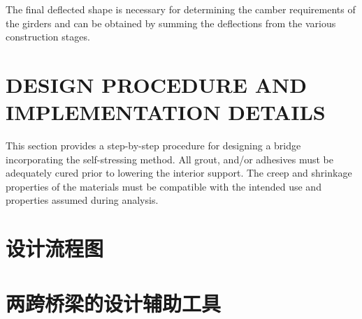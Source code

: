The final deflected shape is necessary for determining the camber requirements of the girders and can be obtained by summing the deflections from the various construction stages.

\section{DESIGN PROCEDURE AND IMPLEMENTATION DETAILS}

This section provides a step-by-step procedure for designing a bridge incorporating the self-stressing method. All grout, and/or adhesives must be adequately cured prior to lowering the interior support. The creep and shrinkage properties of the materials must be compatible with the intended use and properties assumed during analysis.


\section{设计流程图}

\section{两跨桥梁的设计辅助工具}